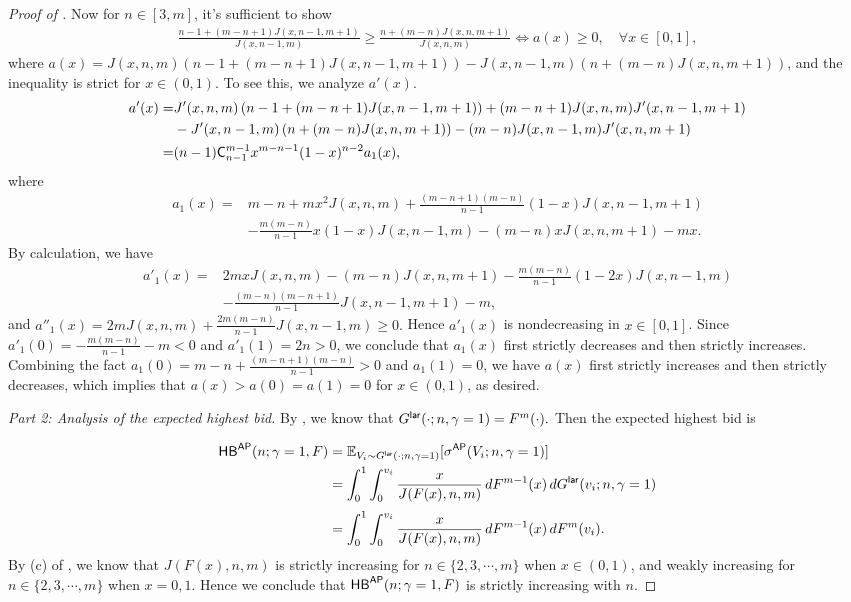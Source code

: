 \begin{proof}[{Proof of }]
Now for $n\in [3,m]$, it's sufficient to show 
\begin{align*}
   \frac{n-1 + (m-n +1)J(x,n-1,m+1)}{J(x,n-1,m)} \geq  \frac{n + (m-n)J(x,n,m+1)}{J(x,n,m)} \Longleftrightarrow a(x)\geq0, \quad \forall x\in[0,1],
\end{align*}
where $a(x) = J(x,n,m) \left(n-1 + (m-n +1)J(x,n-1,m+1) \right) - J(x,n-1,m) \left(n + (m-n )J(x,n,m+1) \right)$, and the inequality is strict for $x\in(0,1)$. To see this, we analyze $a'(x)$.
\begin{align*}
 a'(x) = & J'(x,n,m) \left(n-1 + (m-n +1)J(x,n-1,m+1) \right)  + (m-n+1)J(x,n,m)J'(x,n-1,m+1) \\
 & - J'(x,n-1,m) \left(n + (m-n )J(x,n,m+1)\right) - (m-n)J(x,n-1,m)J'(x,n,m+1)\\
 =& (n-1)\mathsf{C}_{n-1}^{m-1} x^{m-n-1}(1-x)^{n-2}a_1(x),
\end{align*}
where 
\begin{align*}
a_1(x) =& m-n + mx^2J(x,n,m) + \frac{(m-n+1)(m-n)}{n-1}(1-x) J(x,n-1,m+1) \\
&-  \frac{m(m-n)}{n-1}x(1-x) J(x,n-1,m) - (m-n)x J(x,n,m+1) -mx.
\end{align*}
By calculation, we have 
\begin{align*}
    a'_1(x) =& 2mxJ(x,n,m) - (m-n) J(x,n,m+1) - \frac{m(m-n)}{n-1}(1-2x)J(x,n-1,m)\\
    &- \frac{(m-n)(m-n+1)}{n-1}J(x,n-1,m+1) - m,
\end{align*}
and $a''_1(x) = 2mJ(x,n,m) + \frac{2m(m-n)}{n-1}J(x,n-1,m)\geq 0.$ Hence $a'_1(x) $ is nondecreasing in $x\in[0,1]$. Since $a'_1(0) = -\frac{m(m-n)}{n-1} - m<0$ and $a'_1(1) = 2n>0$, we conclude that $a_1(x)$ first strictly decreases and then strictly increases. Combining the fact $a_1(0) = m-n + \frac{(m-n+1)(m-n)}{n-1}>0$ and $a_1(1) = 0$, we have $a(x)$ first strictly increases and then strictly decreases, which implies that $a(x)> a(0)=a(1)= 0$ for $x\in (0,1)$, as desired.


\medskip

\noindent\textit{Part 2: Analysis of the expected highest bid.} By , we know that  $G^{\mathsf{lar}}(\cdot; n,\gamma=1) =F^m(\cdot).$ Then the expected highest bid is

\begin{align*}
 \mathsf{HB}^{\mathsf{AP}}(n;\gamma=1,F) & = \mathbb{E}_{V_i\sim G^{\mathsf{lar}}(\cdot; n,\gamma=1)}[\sigma^{\mathsf{AP}}(V_i;n,\gamma=1)]\\
 &= \int_0^1 \int_0^{v_i} \frac{x}{J(F(x),n,m)}\, dF^{m-1}(x)\, dG^{\mathsf{lar}}(v_i;n,\gamma=1)\\[1mm]
 &= \int_0^1 \int_0^{v_i} \frac{x}{J(F(x),n,m)}\, dF^{m-1}(x)\, dF^{m}(v_i).
\end{align*}
By (c) of , we know that $J(F(x),n,m)$ is strictly increasing for $n\in \{2,3,\cdots,m\}$ when $x\in (0,1)$, and weakly increasing for $n\in \{2,3,\cdots,m\}$ when $x=0,1$. Hence we conclude that $\mathsf{HB}^{\mathsf{AP}}(n;\gamma=1,F)$ is strictly increasing with $n$.


\end{proof}
